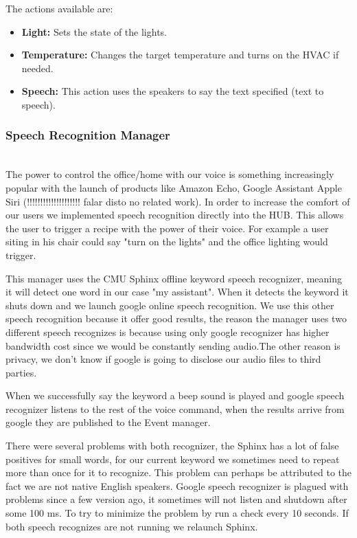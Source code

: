 The actions available are:

\begin{itemize}
  \item \textbf{Light:} Sets the state of the lights.
  \item \textbf{Temperature:} Changes the target temperature and turns on the HVAC if needed.
  \item \textbf{Speech:} This action uses the speakers to say the text specified (text to speech).
\end{itemize}


\subsubsection{Speech Recognition Manager}\mbox{}\\

The power to control the office/home with our voice is something increasingly popular with the launch of products like Amazon Echo, Google Assistant Apple Siri (!!!!!!!!!!!!!!!!!!!! falar disto no related work). In order to increase the comfort of our users we implemented speech recognition directly into the HUB. This allows the user to trigger a recipe with the power of their voice. For example a user siting in his chair could say "turn on the lights" and the office lighting would trigger. 

This manager uses the CMU Sphinx offline keyword speech recognizer, meaning it will detect one word in our case "my assistant". When it detects the keyword it shuts down and we launch google online speech recognition. We use this other speech recognition because it offer good results, the reason the manager uses two different speech recognizes is because using only google recognizer has higher bandwidth cost since we would be constantly sending audio.The other reason is privacy, we don't know if google is going to disclose our audio files to third parties.

When we successfully say the keyword a beep sound is played and google speech recognizer listens to the rest of the voice command, when the results arrive from google they are published to the Event manager.

There were several problems with both recognizer, the Sphinx has a lot of false positives for small words, for our current keyword we sometimes need to repeat more than once for it to recognize. This problem can perhaps be attributed to the fact we are not native English speakers. 
Google speech recognizer is plagued with problems since a few version ago, it sometimes will not listen and shutdown after some 100 ms. To try to minimize the problem by run a check every 10 seconds. If both speech recognizes are not running we relaunch Sphinx.

